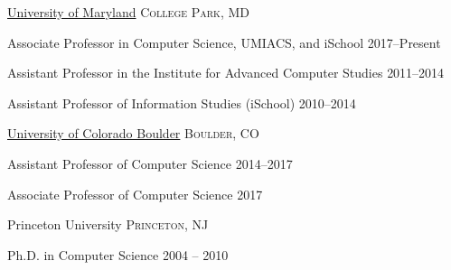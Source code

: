 \documentclass[10pt,a4paper]{article} %
\begin{document}
\spacedhrule{0.5em}{-0.4em} %





\headedsection %
{\href{http://umiacs.umd.edu}{University of Maryland}}
{\textsc{College Park, MD}} {

\headedsubsection %
{Associate Professor in Computer Science, UMIACS, and iSchool}
{2017--Present}
{}


\headedsubsection %
{Assistant Professor in the Institute for Advanced Computer Studies}
{2011--2014}
{}

\headedsubsection %
{Assistant Professor of Information Studies (iSchool)}
{2010--2014}
{}

}

\headedsection
{\href{http://cs.colorado.edu/}{University of Colorado Boulder}}
{\textsc{Boulder, CO}} {

\headedsubsection %
{Assistant Professor of Computer Science}
{2014--2017}
{}

\headedsubsection %
{Associate Professor of Computer Science}
{2017}
{}
}


\spacedhrule{-0.2em}{-0.4em} %



\headedsection %
{Princeton University}
{\textsc{Princeton, NJ}} {

\headedsubsection %
{Ph.D. in Computer Science}
{2004 -- 2010}
{}
}
\end{document}
